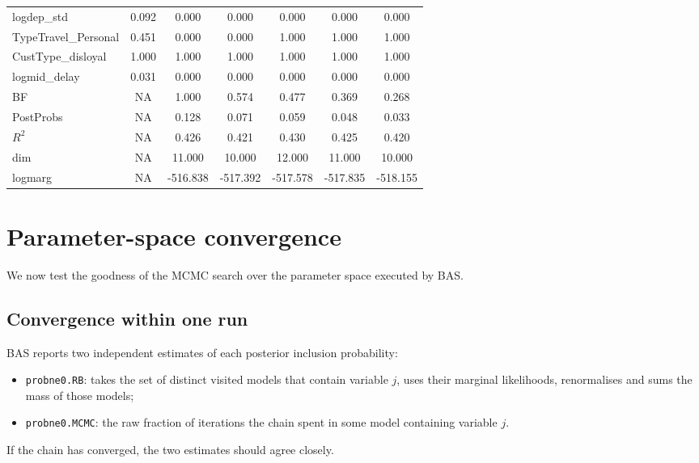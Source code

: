 \begin{table}[htbp]
\begin{tabular}{l S S S S S S}
logdep\_std          & 0.092 & 0.000 & 0.000 & 0.000 & 0.000 & 0.000\\
TypeTravel\_Personal & 0.451 & 0.000 & 0.000 & 1.000 & 1.000 & 1.000\\
CustType\_disloyal   & 1.000 & 1.000 & 1.000 & 1.000 & 1.000 & 1.000\\
logmid\_delay        & 0.031 & 0.000 & 0.000 & 0.000 & 0.000 & 0.000\\
\midrule
BF        & {NA} & 1.000    & 0.574    & 0.477    & 0.369    & 0.268\\
PostProbs & {NA} & 0.128    & 0.071    & 0.059    & 0.048    & 0.033\\
$R^2$     & {NA} & 0.426    & 0.421    & 0.430    & 0.425    & 0.420\\
dim       & {NA} & 11.000   & 10.000   & 12.000   & 11.000   & 10.000\\
logmarg   & {NA} & -516.838 & -517.392 & -517.578 & -517.835 & -518.155\\
\bottomrule
\end{tabular}
\end{table}

\section{Parameter-space convergence}


We now test the goodness of the MCMC search over the parameter space
executed by BAS.

\subsection*{Convergence within one run}
BAS reports two independent estimates of each posterior inclusion
probability:
\begin{itemize}
  \item \texttt{probne0.RB}: takes the set of distinct visited models that
  contain variable $j$, uses their marginal likelihoods, renormalises and
  sums the mass of those models;
  \item \texttt{probne0.MCMC}: the raw fraction of iterations the chain
  spent in some model containing variable $j$.
\end{itemize}
If the chain has converged, the two estimates should agree closely.

